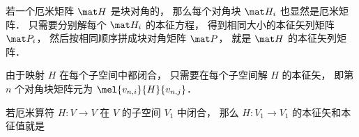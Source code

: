 

\begin{theorem}{}
若一个厄米矩阵 $\mat H$ 是块对角的， 那么每个对角块 $\mat H_i$ 也显然是厄米矩阵． 只需要分别解每个 $\mat H_i$ 的本征方程， 得到相同大小的本征矢列矩阵 $\mat P_i$， 然后按相同顺序拼成块对角矩阵 $\mat P$， 就是 $\mat H$ 的本征矢列矩阵．
\end{theorem}


由于映射 $H$ 在每个子空间中都闭合， 只需要在每个子空间解 $H$ 的本征矢， 即第 $n$ 个对角块矩阵元为 $\mel{v_{n,i}}{H}{v_{n,j}}$．

\begin{theorem}{}
若厄米算符 $H:V\to V$ 在 $V$ 的子空间 $V_1$ 中闭合， 那么 $H:V_1\to V_1$ 的本征矢和本征值就是
\end{theorem}
